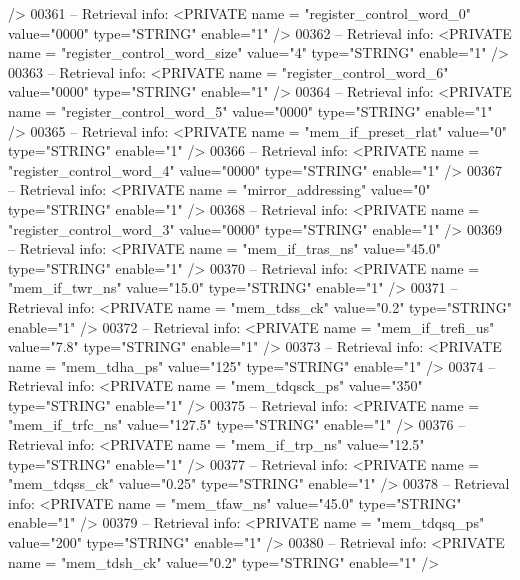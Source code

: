 \begin{DoxyCode}
{{       />}
00361 \textcolor{keyword}{-- Retrieval info:      <PRIVATE name = "register\_control\_word\_0" value="0000"  type="STRING"  enable="1"
       />}
00362 \textcolor{keyword}{-- Retrieval info:      <PRIVATE name = "register\_control\_word\_size" value="4"  type="STRING"  enable="1"
       />}
00363 \textcolor{keyword}{-- Retrieval info:      <PRIVATE name = "register\_control\_word\_6" value="0000"  type="STRING"  enable="1"
       />}
00364 \textcolor{keyword}{-- Retrieval info:      <PRIVATE name = "register\_control\_word\_5" value="0000"  type="STRING"  enable="1"
       />}
00365 \textcolor{keyword}{-- Retrieval info:      <PRIVATE name = "mem\_if\_preset\_rlat" value="0"  type="STRING"  enable="1" />}
00366 \textcolor{keyword}{-- Retrieval info:      <PRIVATE name = "register\_control\_word\_4" value="0000"  type="STRING"  enable="1"
       />}
00367 \textcolor{keyword}{-- Retrieval info:      <PRIVATE name = "mirror\_addressing" value="0"  type="STRING"  enable="1" />}
00368 \textcolor{keyword}{-- Retrieval info:      <PRIVATE name = "register\_control\_word\_3" value="0000"  type="STRING"  enable="1"
       />}
00369 \textcolor{keyword}{-- Retrieval info:      <PRIVATE name = "mem\_if\_tras\_ns" value="45.0"  type="STRING"  enable="1" />}
00370 \textcolor{keyword}{-- Retrieval info:      <PRIVATE name = "mem\_if\_twr\_ns" value="15.0"  type="STRING"  enable="1" />}
00371 \textcolor{keyword}{-- Retrieval info:      <PRIVATE name = "mem\_tdss\_ck" value="0.2"  type="STRING"  enable="1" />}
00372 \textcolor{keyword}{-- Retrieval info:      <PRIVATE name = "mem\_if\_trefi\_us" value="7.8"  type="STRING"  enable="1" />}
00373 \textcolor{keyword}{-- Retrieval info:      <PRIVATE name = "mem\_tdha\_ps" value="125"  type="STRING"  enable="1" />}
00374 \textcolor{keyword}{-- Retrieval info:      <PRIVATE name = "mem\_tdqsck\_ps" value="350"  type="STRING"  enable="1" />}
00375 \textcolor{keyword}{-- Retrieval info:      <PRIVATE name = "mem\_if\_trfc\_ns" value="127.5"  type="STRING"  enable="1" />}
00376 \textcolor{keyword}{-- Retrieval info:      <PRIVATE name = "mem\_if\_trp\_ns" value="12.5"  type="STRING"  enable="1" />}
00377 \textcolor{keyword}{-- Retrieval info:      <PRIVATE name = "mem\_tdqss\_ck" value="0.25"  type="STRING"  enable="1" />}
00378 \textcolor{keyword}{-- Retrieval info:      <PRIVATE name = "mem\_tfaw\_ns" value="45.0"  type="STRING"  enable="1" />}
00379 \textcolor{keyword}{-- Retrieval info:      <PRIVATE name = "mem\_tdqsq\_ps" value="200"  type="STRING"  enable="1" />}
00380 \textcolor{keyword}{-- Retrieval info:      <PRIVATE name = "mem\_tdsh\_ck" value="0.2"  type="STRING"  enable="1" />}
}
\end{DoxyCode}
